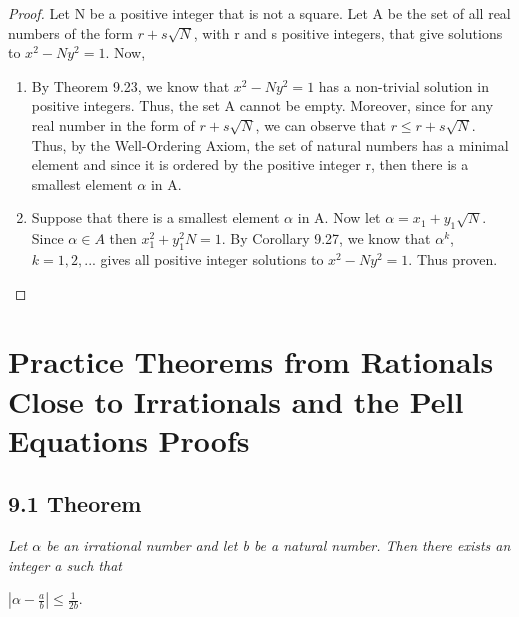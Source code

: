 \documentclass{article}
\begin{document}
\begin{proof}
Let N be a positive integer that is not a square. Let A be the set of all real numbers of the form $r + s\sqrt{N}$, with r and s positive integers, that give solutions to $x^2 - Ny^2 = 1$. Now, 
\begin{enumerate}
    \item By Theorem 9.23, we know that $x^2 - Ny^2 = 1$ has a non-trivial solution in positive integers. Thus, the set A cannot be empty. Moreover, since for any real number in the form of $r + s\sqrt{N}$, we can observe that $r \leq r + s\sqrt{N}$. Thus, by the Well-Ordering Axiom, the set of natural numbers has a minimal element and since it is ordered by the positive integer r, then there is a smallest element $\alpha$ in A.
    \item Suppose that there is a smallest element $\alpha$ in A. Now let $\alpha = x_1 + y_1\sqrt{N}$. Since $\alpha \in A$ then $x_1^2 + y_1^2N = 1$. By Corollary 9.27, we know that $\alpha^k$, $k = 1,2,...$ gives all positive integer solutions to $x^2  -Ny^2 = 1$. Thus proven.
\end{enumerate}
\end{proof}

\section*{Practice Theorems from Rationals Close to Irrationals and the Pell Equations Proofs}

\subsection*{9.1 Theorem} 
\quad \textit{Let $\alpha$ be an irrational number and let b be a natural number. Then there exists an integer a such that}
\begin{center}
    $|\alpha - \frac{a}{b}| \leq \frac{1}{2b}$.
\end{center}
\end{document}
